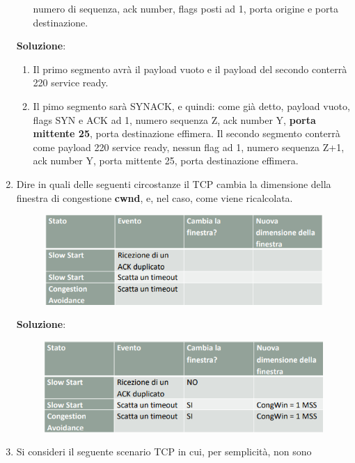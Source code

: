 \documentclass[11pt,a4paper]{article}
\theoremstyle{definition}
\begin{document}
\begin{enumerate}
\begin{enumerate}
		            numero di sequenza, ack number, flags posti ad 1,
		            porta origine e porta destinazione.
	      \end{enumerate}
	      \textbf{Soluzione}:
	      \begin{enumerate}
		      \item Il primo segmento avrà il payload vuoto e il payload del secondo conterrà 220 service ready.
		      \item Il pimo segmento sarà SYNACK, e quindi: come già detto, payload vuoto, flags SYN e ACK ad 1, numero sequenza Z, ack number Y, \textbf{porta mittente 25}, porta destinazione effimera. Il secondo segmento conterrà come payload 220 service ready, nessun flag ad 1, numero sequenza Z+1, ack number Y, porta	mittente 25, porta destinazione effimera.
	      \end{enumerate}
	      \newpage
	\item Dire in quali delle seguenti circostanze il TCP cambia la dimensione della
	      finestra di congestione \textbf{cwnd}, e, nel caso, come viene ricalcolata.
	      \begin{figure}[!h]
		      \includegraphics[scale=0.5]{Immagini/Es5_1.png}
		      \centering
	      \end{figure}
	      \begin{flushleft}
		      \textbf{Soluzione}:
	      \end{flushleft}
	      \begin{figure}[!h]
		      \includegraphics[scale=0.5]{Immagini/Es5_2.png}
		      \centering
	      \end{figure}
	\item Si consideri il seguente scenario TCP in cui, per semplicità, non sono

\end{enumerate}
\end{document}
